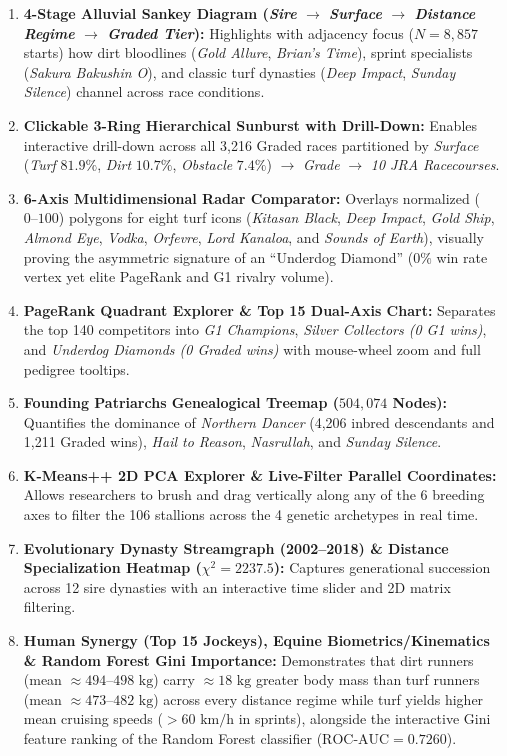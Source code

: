 \documentclass[12pt,a4paper]{article}
\begin{document}
\begin{enumerate}
    \item \textbf{4-Stage Alluvial Sankey Diagram (\textit{Sire} $\to$ \textit{Surface} $\to$ \textit{Distance Regime} $\to$ \textit{Graded Tier}):} Highlights with adjacency focus ($N = 8,857$ starts) how dirt bloodlines (\textit{Gold Allure}, \textit{Brian's Time}), sprint specialists (\textit{Sakura Bakushin O}), and classic turf dynasties (\textit{Deep Impact}, \textit{Sunday Silence}) channel across race conditions.
    \item \textbf{Clickable 3-Ring Hierarchical Sunburst with Drill-Down:} Enables interactive drill-down across all 3,216 Graded races partitioned by \textit{Surface} (\textit{Turf} $81.9\%$, \textit{Dirt} $10.7\%$, \textit{Obstacle} $7.4\%$) $\to$ \textit{Grade} $\to$ \textit{10 JRA Racecourses}.
    \item \textbf{6-Axis Multidimensional Radar Comparator:} Overlays normalized ($0\text{--}100$) polygons for eight turf icons (\textit{Kitasan Black}, \textit{Deep Impact}, \textit{Gold Ship}, \textit{Almond Eye}, \textit{Vodka}, \textit{Orfevre}, \textit{Lord Kanaloa}, and \textit{Sounds of Earth}), visually proving the asymmetric signature of an ``Underdog Diamond'' ($0\%$ win rate vertex yet elite PageRank and G1 rivalry volume).
    \item \textbf{PageRank Quadrant Explorer \& Top 15 Dual-Axis Chart:} Separates the top 140 competitors into \textit{G1 Champions}, \textit{Silver Collectors (0 G1 wins)}, and \textit{Underdog Diamonds (0 Graded wins)} with mouse-wheel zoom and full pedigree tooltips.
    \item \textbf{Founding Patriarchs Genealogical Treemap ($504,074$ Nodes):} Quantifies the dominance of \textit{Northern Dancer} (4,206 inbred descendants and 1,211 Graded wins), \textit{Hail to Reason}, \textit{Nasrullah}, and \textit{Sunday Silence}.
    \item \textbf{K-Means++ 2D PCA Explorer \& Live-Filter Parallel Coordinates:} Allows researchers to brush and drag vertically along any of the 6 breeding axes to filter the 106 stallions across the 4 genetic archetypes in real time.
    \item \textbf{Evolutionary Dynasty Streamgraph (2002--2018) \& Distance Specialization Heatmap ($\chi^2 = 2237.5$):} Captures generational succession across 12 sire dynasties with an interactive time slider and 2D matrix filtering.
    \item \textbf{Human Synergy (Top 15 Jockeys), Equine Biometrics/Kinematics \& Random Forest Gini Importance:} Demonstrates that dirt runners (mean $\approx 494\text{--}498\text{ kg}$) carry $\approx 18\text{ kg}$ greater body mass than turf runners (mean $\approx 473\text{--}482\text{ kg}$) across every distance regime while turf yields higher mean cruising speeds ($> 60\text{ km/h}$ in sprints), alongside the interactive Gini feature ranking of the Random Forest classifier ($\text{ROC-AUC} = 0.7260$).
\end{enumerate}
\end{document}
